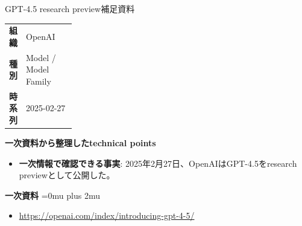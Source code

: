 \begin{technicalnote}{GPT-4.5 research preview}{補足資料}
\begingroup
\begin{tabularx}{\linewidth}{@{}>{\bfseries}p{0.22\linewidth}X@{}}
組織 & OpenAI \\
種別 & Model / Model Family \\
時系列 & 2025-02-27 \\
\end{tabularx}
\smallskip
\begin{minipage}{\linewidth}
{\bfseries 一次資料から整理したtechnical points}
\begin{itemize}[leftmargin=1.5em,itemsep=0.35em]
\item \textbf{一次情報で確認できる事実}: 2025年2月27日、OpenAIはGPT-4.5をresearch previewとして公開した。
\end{itemize}
\begin{samepage}
{\bfseries 一次資料}
\begingroup\sloppy
\Urlmuskip=0mu plus 2mu\relax
\begin{itemize}[leftmargin=1.5em,itemsep=0.25em]
\item {\scriptsize\url{https://openai.com/index/introducing-gpt-4-5/}}
\end{itemize}
\endgroup
\end{samepage}
\end{minipage}
\endgroup
\end{technicalnote}
\medskip

